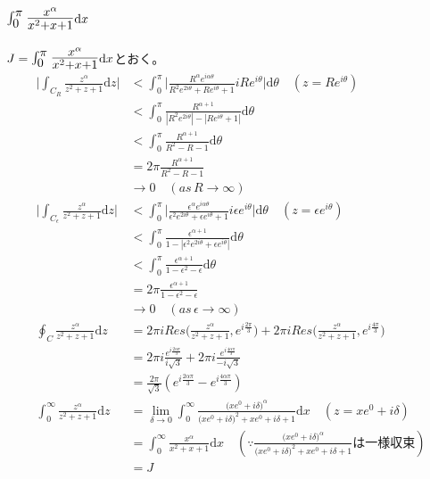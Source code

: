 \documentclass[dvipdfmx,a4paper]{jsarticle}
\begin{document}
  \subsection{$\mbox{\Large $\int_0^{\pi}\frac{x^\alpha}{x^2 + x + 1}$}\mathrm{d}x$}
  $J = \mbox{\Large $\int_0^{\pi}\frac{x^\alpha}{x^2 + x + 1}$}\mathrm{d}x$とおく。
 \begin{align*}
 \biggl|\int_{C_R}\frac{z^{\alpha}}{z^2 + z + 1}\mathrm{d}z\biggr| &< \int_{0}^{\pi}\biggl|\frac{R^{\alpha}e^{i\alpha\theta}}{R^2e^{2i\theta} + Re^{i\theta} + 1}iRe^{i\theta}\biggr|\mathrm{d}\theta \quad(z = Re^{i\theta})\\
 &< \int_{0}^{\pi}\frac{R^{\alpha + 1}}{|R^2e^{2i\theta}| - |Re^{i\theta} + 1|}\mathrm{d}\theta\\
 &< \int_{0}^{\pi}\frac{R^{\alpha + 1}}{R^2 - R - 1}\mathrm{d}\theta\\
 &= 2\pi\frac{R^{\alpha + 1}}{R^2 - R - 1}\\
 &\to 0\quad(as\, R \to \infty)\\
 \biggl|\int_{C_\epsilon}\frac{z^{\alpha}}{z^2 + z + 1}\mathrm{d}z\biggr| &< \int_{0}^{\pi}\biggl|\frac{\epsilon^{\alpha}e^{i\alpha\theta}}{\epsilon^2e^{2i\theta} + \epsilon e^{i\theta} + 1}i\epsilon e^{i\theta}\biggr|\mathrm{d}\theta \quad(z = \epsilon e^{i\theta})\\
 &< \int_{0}^{\pi}\frac{\epsilon^{\alpha + 1}}{1 - |\epsilon^2e^{2i\theta} + \epsilon e^{i\theta}|}\mathrm{d}\theta\\
 &< \int_{0}^{\pi}\frac{\epsilon^{\alpha + 1}}{1 - \epsilon^2 - \epsilon}\mathrm{d}\theta\\
 &= 2\pi\frac{\epsilon^{\alpha + 1}}{1 - \epsilon^2 - \epsilon}\\
 &\to 0\quad(as\, \epsilon \to \infty)\\
 \oint_C\frac{z^{\alpha}}{z^2 + z + 1}\mathrm{d}z &= 2\pi iRes\biggl(\frac{z^{\alpha}}{z^2 + z + 1}, e^{i\frac{2\pi}{3}}\biggr) + 2\pi iRes\biggl(\frac{z^{\alpha}}{z^2 + z + 1}, e^{i\frac{4\pi}{3}}\biggr)\\
 &= 2\pi i\frac{e^{i\frac{2\alpha\pi}{3}}}{i \sqrt{3}} + 2\pi i\frac{e^{i\frac{4\alpha\pi}{3}}}{-i \sqrt{3}}\\
 &= \frac{2\pi}{\sqrt{3}} (e^{i\frac{2\alpha\pi}{3}} - e^{i\frac{4\alpha\pi}{3}})\\
 \int_{0}^{\infty} \frac{z^{\alpha}}{z^2 + z + 1} \mathrm{d}z &= \lim_{\delta \to 0}\int_{0}^{\infty} \frac{\bigl(xe^0 + i\delta\bigr)^{\alpha}}{\bigl(xe^0 + i\delta\bigr)^2 + xe^0 + i\delta +  1} \mathrm{d}x \quad(z = xe^0 + i\delta)\\
 &= \int_{0}^{\infty} \frac{x^{\alpha}}{x^2 + x + 1} \mathrm{d}x\quad(\because \frac{\bigl(xe^0 + i\delta\bigr)^{\alpha}}{\bigl(xe^0 + i\delta\bigr)^2 + xe^0 + i\delta +  1}は一様収束)\\
 &= J
 \end{align*}
\end{document}
